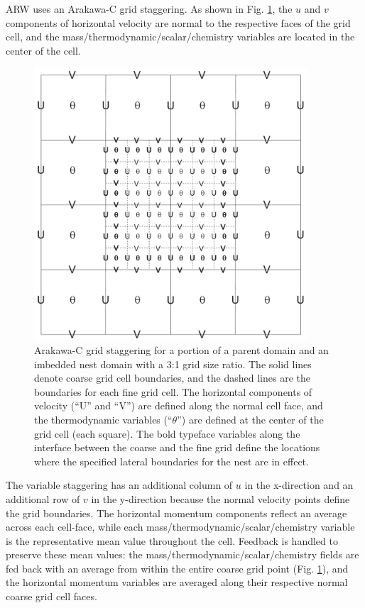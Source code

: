 ARW uses an Arakawa-C grid staggering.  As shown in Fig.
\ref{figure:cg_fg}, the $u$ and $v$ components 
of horizontal velocity are normal to the respective faces of the 
grid cell, and the mass/thermodynamic/scalar/chemistry variables are located 
in the center of the cell.   

%
%
\begin{figure}
  \centering
  \includegraphics[width=4in]{figures/cg_fg.pdf}
  \caption{\label{figure:cg_fg}
Arakawa-C grid staggering for a portion of a parent domain and an
imbedded nest domain with a 3:1 grid size ratio.  The solid lines
denote coarse grid cell boundaries, and the dashed lines are the
boundaries for each fine grid cell.  The horizontal components of
velocity (``U'' and ``V'') are defined along the normal cell face, and
the thermodynamic variables (``$\theta$'') are defined at the center of
the grid cell (each square).  The bold typeface variables along the
interface between the coarse and the fine grid define the locations
where the specified lateral boundaries for the nest are in
effect.  } \end{figure}

The variable staggering has an additional column 
of $u$ in the x-direction and an additional row of $v$ in the y-direction
because the normal velocity points define the grid boundaries.
The horizontal momentum components reflect an average across each 
cell-face, while each mass/thermodynamic/scalar/chemistry variable
is the representative mean value throughout the cell.  
Feedback is handled to preserve these mean values: the mass/thermodynamic/scalar/chemistry
fields are fed back with an average from within the entire 
coarse grid point (Fig. \ref{figure:cg_fg}), and the horizontal momentum variables are
averaged along their respective normal coarse grid cell faces.

